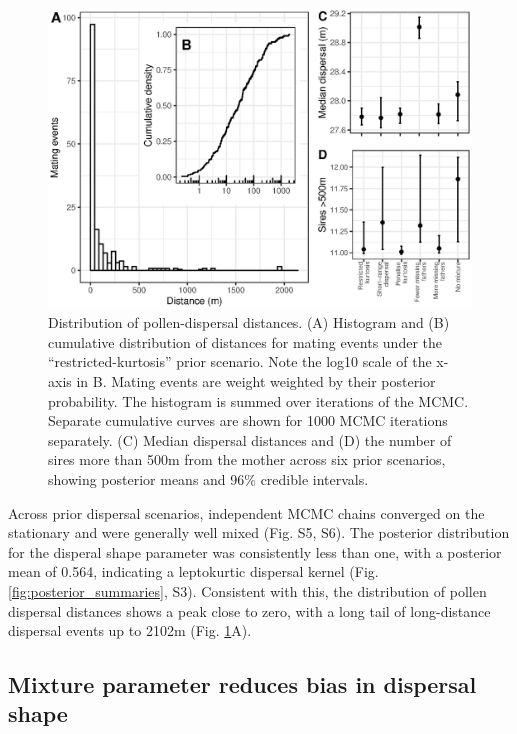 \documentclass[10pt, a4paper, twocolumn]{article} %
\begin{document}
\begin{figure}
    \centering
    \includegraphics{dispersal.eps}
    \caption{Distribution of pollen-dispersal distances.  (A) Histogram and (B) cumulative distribution of distances for mating events under the “restricted-kurtosis” prior scenario. Note the log10 scale of the x-axis in B. Mating events are weight weighted by their posterior probability. The histogram is summed over iterations of the MCMC. Separate cumulative curves are shown for 1000 MCMC iterations separately. (C) Median dispersal distances and (D) the number of sires more than 500m from the mother across six prior scenarios, showing posterior means and 96\% credible intervals.}
    \label{fig:dispersal}
\end{figure}

Across prior dispersal scenarios, independent MCMC chains converged on the stationary and were generally well mixed (Fig. S5, S6).
The posterior distribution for the disperal shape parameter was consistently less than one, with a posterior mean of 0.564, indicating a leptokurtic dispersal kernel (Fig. \ref{fig:posterior_summaries}, S3).
Consistent with this, the distribution of pollen dispersal distances shows a peak close to zero, with a long tail of long-distance dispersal events up to 2102m (Fig. \ref{fig:dispersal}A).

\subsection{Mixture parameter reduces bias in dispersal shape}
\end{document}

